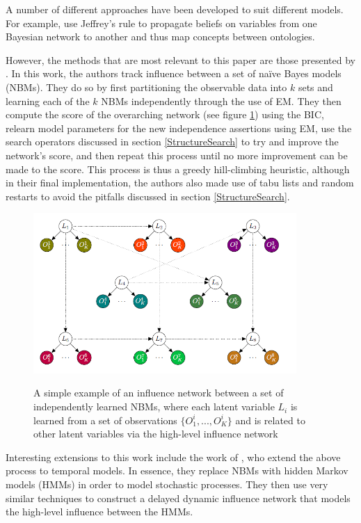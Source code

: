 \documentclass [11pt]{article}
\begin{document}
A number of different approaches have been developed to suit different models. For example, \cite{Pan05} use Jeffrey's rule \citep{pearl90} to propagate beliefs on variables from one Bayesian network to another and thus map concepts between ontologies. 

However, the methods that are most relevant to this paper are those presented by \cite{ajoodha17}. In this work, the authors track influence between a set of na\"{i}ve Bayes models (NBMs). They do so by first partitioning the observable data into $k$ sets and learning each of the $k$ NBMs independently through the use of EM. They then compute the score of the overarching network (see figure \ref{fig:ajoodha}) using the BIC, relearn model parameters for the new independence assertions using EM, use the search operators discussed in section \ref{StructureSearch} to try and improve the network's score, and then repeat this process until no more improvement can be made to the score. This process is thus a greedy hill-climbing heuristic, although in their final implementation, the authors also made use of tabu lists and random restarts to avoid the pitfalls discussed in section \ref{StructureSearch}.
\begin{figure}[H]
\centering
\caption{A simple example of an influence network between a set of independently learned NBMs, where each latent variable $L_{i}$ is learned from a set of observations $\{O_{1}^{i},...,O_{K}^{i}\}$ and is related to other latent variables via the high-level influence network \citep{ajoodha17}}
\includegraphics[width=10cm]{ajoodha.png}\label{fig:ajoodha}
\end{figure}
Interesting extensions to this work include the work of \cite{ajoodha18}, who extend the above process to temporal models. In essence, they replace NBMs with hidden Markov models (HMMs) in order to model stochastic processes. They then use very similar techniques to construct a delayed dynamic influence network that models the high-level influence between the HMMs.
\end{document}
